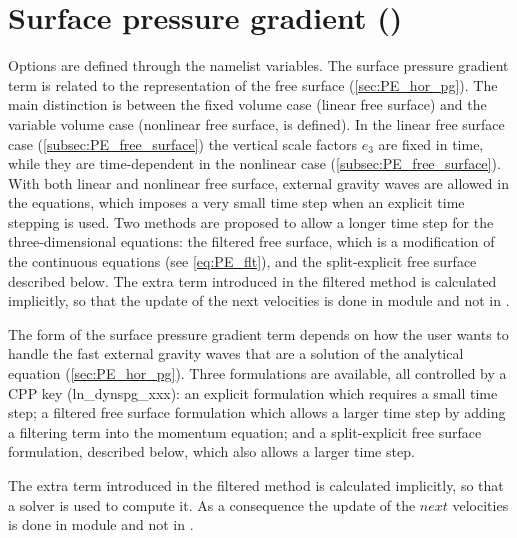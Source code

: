 \documentclass[../main/NEMO_manual]{subfiles}
\begin{document}
\section{Surface pressure gradient (\protect{})}
\label{sec:DYN_spg}


Options are defined through the  namelist variables.
The surface pressure gradient term is related to the representation of the free surface (\autoref{sec:PE_hor_pg}).
The main distinction is between the fixed volume case (linear free surface) and
the variable volume case (nonlinear free surface,  is defined).
In the linear free surface case (\autoref{subsec:PE_free_surface})
the vertical scale factors $e_{3}$ are fixed in time,
while they are time-dependent in the nonlinear case (\autoref{subsec:PE_free_surface}).
With both linear and nonlinear free surface, external gravity waves are allowed in the equations, 
which imposes a very small time step when an explicit time stepping is used.
Two methods are proposed to allow a longer time step for the three-dimensional equations: 
the filtered free surface, which is a modification of the continuous equations (see \autoref{eq:PE_flt}), 
and the split-explicit free surface described below.
The extra term introduced in the filtered method is calculated implicitly, 
so that the update of the next velocities is done in module  and not in .


The form of the surface pressure gradient term depends on how the user wants to
handle the fast external gravity waves that are a solution of the analytical equation (\autoref{sec:PE_hor_pg}).
Three formulations are available, all controlled by a CPP key (ln\_dynspg\_xxx):
an explicit formulation which requires a small time step;
a filtered free surface formulation which allows a larger time step by
adding a filtering term into the momentum equation; 
and a split-explicit free surface formulation, described below, which also allows a larger time step.

The extra term introduced in the filtered method is calculated implicitly, so that a solver is used to compute it.
As a consequence the update of the $next$ velocities is done in module  and not in .
\end{document}
